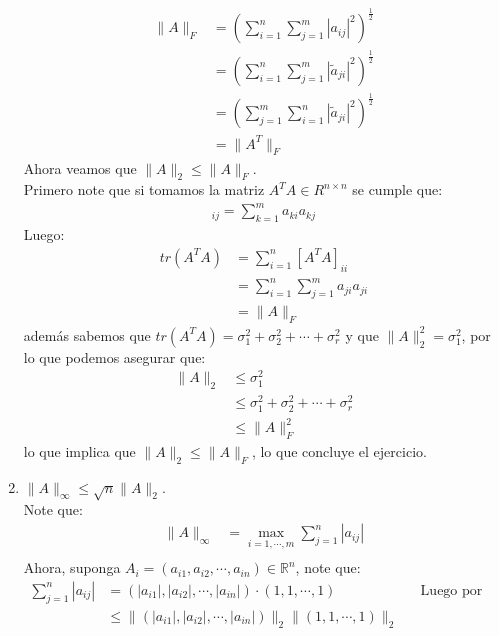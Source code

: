 \begin{homeworkProblem}
\begin{solucion}
\begin{enumerate}
        \begin{align*}
          \|A\|_{F}&=\left( \sum_{i=1}^n \sum_{j=1}^{m}|a_{ij}|^2 \right)^{\frac{1}{2}}\\
          &=\left( \sum_{i=1}^n \sum_{j=1}^{m}|\tilde{a}_{ji}|^2 \right)^{\frac{1}{2}}\\
          &=\left( \sum_{j=1}^m \sum_{i=1}^{n}|\tilde{a}_{ji}|^2 \right)^{\frac{1}{2}}\\
          &=\|A^T\|_{F}
        \end{align*}
        Ahora veamos que $\|A\|_{2}\leq \|A\|_{F}$.\\
        Primero note que si tomamos la matriz $A^TA\in R^{n\times n}$ se cumple que:
        \begin{align*}
          [A^TA]_{ij}=\sum_{k=1}^{m}a_{ki}a_{kj}
        \end{align*}
        Luego:
        \begin{align*}
          tr(A^TA)&=\sum_{i=1}^n [A^TA]_{ii}\\
          &=\sum_{i=1}^{n}\sum_{j=1}^{m}a_{ji}a_{ji}\\
          &=\|A\|_{F}
        \end{align*}
        además sabemos que $tr(A^{T}A)=\sigma_1^2+\sigma_2^2+\cdots+\sigma_r^2$ y que $\|A\|_2^2=\sigma_{1}^2$, por lo que podemos asegurar que:
        \begin{align*}
          \|A\|_2&\leq \sigma_1^2\\
          &\leq \sigma_1^2+\sigma_2^2+\cdots+\sigma_r^2\\
          &\leq \|A\|_{F}^2
        \end{align*}
        lo que implica que $\|A\|_2\leq \|A\|_F$, lo que concluye el ejercicio.
        \demostrado
      \item $\|A\|_{\infty}\leq \sqrt{n}\|A\|_2$.\\
        Note que:
        \begin{align*}
          \|A\|_{\infty}&=\max_{i=1,\cdots,m}\sum_{j=1}^{n}|a_{ij}|\\
        \end{align*}
        Ahora, suponga $A_i=(a_{i1},a_{i2},\cdots,a_{in})\in \mathbb{R}^{n}$, note que:
        \begin{align*}
          \sum_{j=1}^{n}|a_{ij}|&= (|a_{i1}|,|a_{i2}|,\cdots,|a_{in}|)\cdot (1,1,\cdots,1) &&\text{Luego por Cauchy-Schwarz.}\\
          &\leq \|(|a_{i1}|,|a_{i2}|,\cdots,|a_{in}|)\|_2\|(1,1,\cdots,1)\|_{2}\\

\end{align*}
\end{enumerate}
\end{solucion}
\end{homeworkProblem}
